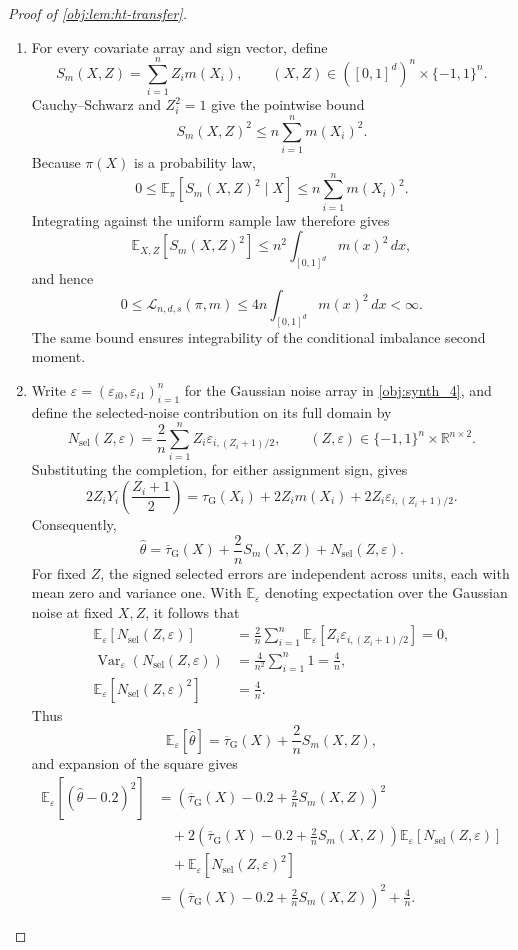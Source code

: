\begin{proof}[Proof of \cref{obj:lem:ht-transfer}]
\begin{enumerate}
\item
For every covariate array and sign vector, define
\[
S_m(X,Z)=\sum_{i=1}^n Z_i m(X_i),
\qquad
(X,Z)\in([0,1]^d)^n\times\{-1,1\}^n.
\]
Cauchy--Schwarz and \(Z_i^2=1\) give the pointwise bound
\[
S_m(X,Z)^2
\leq
n\sum_{i=1}^n m(X_i)^2.
\]
Because \(\pi(X)\) is a probability law,
\[
0\leq
\mathbb E_\pi[S_m(X,Z)^2\mid X]
\leq
n\sum_{i=1}^n m(X_i)^2.
\]
Integrating against the uniform sample law therefore gives
\[
\mathbb E_{X,Z}[S_m(X,Z)^2]
\leq
n^2\int_{[0,1]^d}m(x)^2\,dx,
\]
and hence
\[
0\leq\mathcal L_{n,d,s}(\pi,m)
\leq
4n\int_{[0,1]^d}m(x)^2\,dx
<\infty.
\]
The same bound ensures integrability of the conditional imbalance second moment. %

\item
Write \(\varepsilon=(\varepsilon_{i0},\varepsilon_{i1})_{i=1}^n\) for the Gaussian noise array in \cref{obj:synth_4}, and define the selected-noise contribution on its full domain by
\[
N_{\mathrm{sel}}(Z,\varepsilon)
=
\frac2n\sum_{i=1}^n
Z_i\varepsilon_{i,(Z_i+1)/2},
\qquad
(Z,\varepsilon)\in\{-1,1\}^n\times\mathbb R^{n\times2}.
\]
Substituting the completion, for either assignment sign, gives
\[
2Z_iY_i\!\left(\frac{Z_i+1}{2}\right)
=
\tau_{\mathrm G}(X_i)
+2Z_i m(X_i)
+2Z_i\varepsilon_{i,(Z_i+1)/2}.
\]
Consequently,
\[
\widehat\theta
=
\overline\tau_{\mathrm G}(X)
+\frac2n S_m(X,Z)
+N_{\mathrm{sel}}(Z,\varepsilon).
\]
For fixed \(Z\), the signed selected errors are independent across units, each with mean zero and variance one. With \(\mathbb E_\varepsilon\) denoting expectation over the Gaussian noise at fixed \(X,Z\), it follows that
\[
\begin{aligned}
\mathbb E_\varepsilon[N_{\mathrm{sel}}(Z,\varepsilon)]
&=
\frac2n\sum_{i=1}^n
\mathbb E_\varepsilon[
Z_i\varepsilon_{i,(Z_i+1)/2}]
=0,\\
\operatorname{Var}_\varepsilon(N_{\mathrm{sel}}(Z,\varepsilon))
&=
\frac4{n^2}\sum_{i=1}^n1
=\frac4n,\\
\mathbb E_\varepsilon[N_{\mathrm{sel}}(Z,\varepsilon)^2]
&=\frac4n.
\end{aligned}
\]
Thus
\[
\mathbb E_\varepsilon[\widehat\theta]
=
\overline\tau_{\mathrm G}(X)+\frac2n S_m(X,Z),
\]
and expansion of the square gives
\[
\begin{aligned}
\mathbb E_\varepsilon[(\widehat\theta-0.2)^2]
&=
\left(
\overline\tau_{\mathrm G}(X)-0.2+\frac2n S_m(X,Z)
\right)^2\\
&\quad+
2\left(
\overline\tau_{\mathrm G}(X)-0.2+\frac2n S_m(X,Z)
\right)
\mathbb E_\varepsilon[N_{\mathrm{sel}}(Z,\varepsilon)]\\
&\quad+
\mathbb E_\varepsilon[N_{\mathrm{sel}}(Z,\varepsilon)^2]\\
&=
\left(
\overline\tau_{\mathrm G}(X)-0.2+\frac2n S_m(X,Z)
\right)^2+\frac4n.
\end{aligned}
\]


\end{enumerate}
\end{proof}
